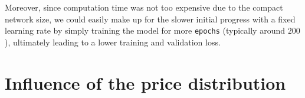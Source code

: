 \documentclass[12pt, letterpaper]{article}
\begin{document}
Moreover, since computation time was not too expensive due to the compact network size, we could easily make up for the slower initial progress with a fixed learning rate by simply training the model for more \texttt{epochs} (typically around $200$), ultimately leading to a lower training and validation loss.



\section{Influence of the price distribution}



\newpage



\end{document}
